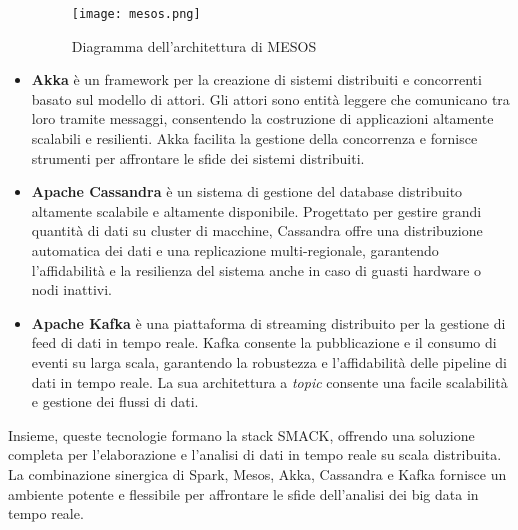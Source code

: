\begin{itemize}
    \begin{figure}[H]
        \centering
        \texttt{[image: mesos.png]}
        \caption[Architettura MESOS]{Diagramma dell'architettura di MESOS \cite{mesos}}
    \end{figure}

    \item \textbf{Akka} è un framework per la creazione di sistemi distribuiti e concorrenti basato sul modello di attori. Gli attori sono entità leggere che comunicano tra loro tramite messaggi, consentendo la costruzione di applicazioni altamente scalabili e resilienti. Akka facilita la gestione della concorrenza e fornisce strumenti per affrontare le sfide dei sistemi distribuiti.
    \item \textbf{Apache Cassandra} è un sistema di gestione del database distribuito altamente scalabile e altamente disponibile. Progettato per gestire grandi quantità di dati su cluster di macchine, Cassandra offre una distribuzione automatica dei dati e una replicazione multi-regionale, garantendo l'affidabilità e la resilienza del sistema anche in caso di guasti hardware o nodi inattivi.
    \item \textbf{Apache Kafka} è una piattaforma di streaming distribuito per la gestione di feed di dati in tempo reale. Kafka consente la pubblicazione e il consumo di eventi su larga scala, garantendo la robustezza e l'affidabilità delle pipeline di dati in tempo reale. La sua architettura a \textit{topic} consente una facile scalabilità e gestione dei flussi di dati.
\end{itemize}

Insieme, queste tecnologie formano la stack SMACK, offrendo una soluzione completa per l'elaborazione e l'analisi di dati in tempo reale su scala distribuita.
La combinazione sinergica di Spark, Mesos, Akka, Cassandra e Kafka fornisce un ambiente potente e flessibile per affrontare le sfide dell'analisi dei big data in tempo reale.